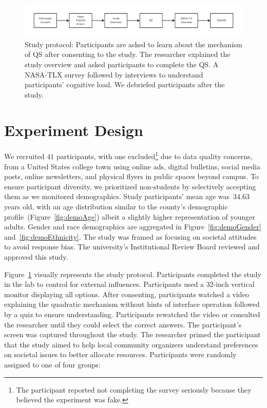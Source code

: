 \begin{figure}[ht!]
    \centering
    \includegraphics[width=1\textwidth]{content/image/study_flow.pdf}
    \caption{Study protocol: Participants are asked to learn about the mechanism of QS after consenting to the study. The researcher explained the study overview and asked participants to complete the QS. A NASA-TLX survey followed by interviews to understand participants' cognitive load. We debriefed participants after the study.}
    \label{fig:studyProtocol}
\end{figure}

\section{Experiment Design}
\label{sec:experiment}
We recruited $41$ participants, with one excluded\footnote{The participant reported not completing the survey seriously because they believed the experiment was fake.} due to data quality concerns, from a United States college town using online ads, digital bulletins, social media posts, online newsletters, and physical flyers in public spaces beyond campus. To ensure participant diversity, we prioritized non-students by selectively accepting them as we monitored demographics. Study participants' mean age was~$34.63$ years old, with an age distribution similar to the county's demographic profile~(Figure~\ref{fig:demoAge}) albeit a slightly higher representation of younger adults. Gender and race demographics are aggregated in Figure~\ref{fig:demoGender} and~\ref{fig:demoEthnicity}. The study was framed as focusing on societal attitudes to avoid response bias. The university's Institutional Review Board reviewed and approved this study. 

Figure~\ref{fig:studyProtocol} visually represents the study protocol. Participants completed the study in the lab to control for external influences. Participants used a 32-inch vertical monitor displaying all options. After consenting, participants watched a video explaining the quadratic mechanism without hints of interface operation followed by a quiz to ensure understanding. Participants rewatched the video or consulted the researcher until they could select the correct answers. The participant's screen was captured throughout the study. The researcher primed the participant that the study aimed to help local community organizers understand preferences on societal issues to better allocate resources. Participants were randomly assigned to one of four groups:

